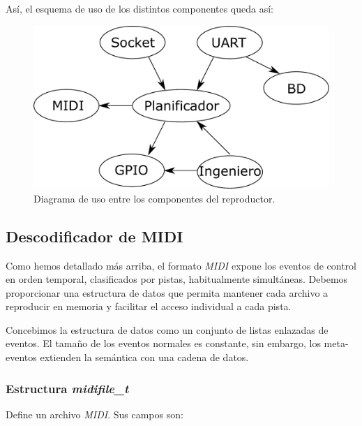 Así, el esquema de uso de los distintos componentes queda así:

\smallskip

\begin{figure}[H]
	\noindent \begin{centering}
		\includegraphics[width=\linewidth/2]{capitulo4/daemon}
		\par\end{centering}
	\smallskip
	\caption{\label{fig:daemon} Diagrama de uso entre los componentes del reproductor.}
\end{figure} 

\smallskip

\subsection{Descodificador de MIDI}

Como hemos detallado más arriba, el formato \textit{MIDI} expone los eventos de control en orden temporal, clasificados por pistas, habitualmente simultáneas. Debemos proporcionar una estructura de datos que permita mantener cada archivo a reproducir en memoria y facilitar el acceso individual a cada pista.

Concebimos la estructura de datos como un conjunto de listas enlazadas de eventos. El tamaño de los eventos normales es constante, sin embargo, los meta-eventos extienden la semántica con una cadena de datos.

\subsubsection{Estructura \textit{midifile\_t}}

Define un archivo \textit{MIDI}. Sus campos son:

